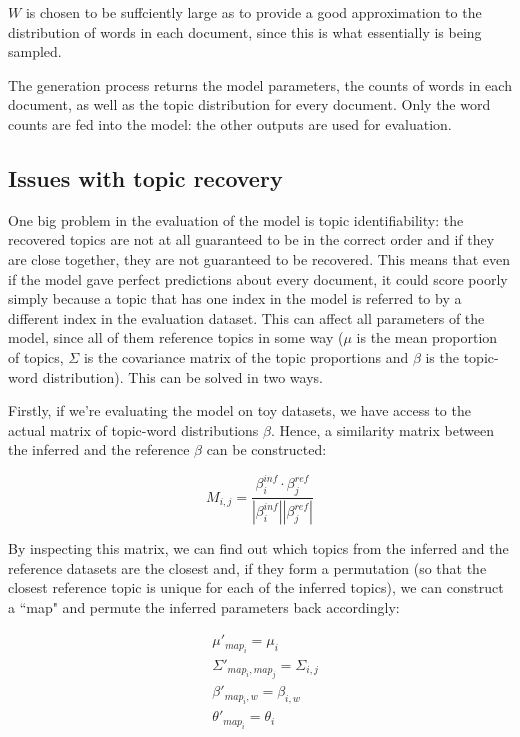 \documentclass[12pt,a4paper,twoside,openright]{report}
\begin{document}
$W$ is chosen to be suffciently large as to provide a good approximation to the distribution of words in each document, since this is what essentially is being sampled.

The generation process returns the model parameters, the counts of words in each document, as well as the topic distribution for every document. Only the word counts are fed into the model: the other outputs are used for evaluation.

\subsection{Issues with topic recovery}

One big problem in the evaluation of the model is topic identifiability: the recovered topics are not at all guaranteed to be in the correct order and if they are close together, they are not guaranteed to be recovered. This means that even if the model gave perfect predictions about every document, it could score poorly simply because a topic that has one index in the model is referred to by a different index in the evaluation dataset. This can affect all parameters of the model, since all of them reference topics in some way ($\mu$ is the mean proportion of topics, $\Sigma$ is the covariance matrix of the topic proportions and $\beta$ is the topic-word distribution). This can be solved in two ways.

Firstly, if we're evaluating the model on toy datasets, we have access to the actual matrix of topic-word distributions $\beta$. Hence, a similarity matrix between the inferred and the reference $\beta$ can be constructed:

\begin{equation}\label{eq:beta_similarity matrix}
M_{i,j} = \frac{\beta^{inf}_i \cdot \beta^{ref}_j}{|\beta^{inf}_i||\beta^{ref}_j|}
\end{equation}

By inspecting this matrix, we can find out which topics from the inferred and the reference datasets are the closest and, if they form a permutation (so that the closest reference topic is unique for each of the inferred topics), we can construct a ``map" and permute the inferred parameters back accordingly:

\begin{align*}
&\mu'_{map_i} = \mu_i \\
&\Sigma'_{map_i, map_j} = \Sigma_{i, j} \\
&\beta'_{map_i, w} = \beta_{i, w} \\
&\theta'_{map_i} = \theta_i
\end{align*}
\end{document}
